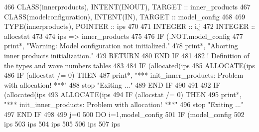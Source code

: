 \begin{DoxyCode}
466     \textcolor{keywordtype}{CLASS}(innerproducts), \textcolor{keywordtype}{INTENT(INOUT)}, \textcolor{keywordtype}{TARGET} :: inner\_products
467     \textcolor{keywordtype}{CLASS}(modelconfiguration), \textcolor{keywordtype}{INTENT(IN)}, \textcolor{keywordtype}{TARGET} :: model\_config
468 
469     \textcolor{keywordtype}{TYPE}(innerproducts), \textcolor{keywordtype}{POINTER} :: ips
470 
471     \textcolor{keywordtype}{INTEGER} :: i,j
472     \textcolor{keywordtype}{INTEGER} :: allocstat
473 
474     ips => inner\_products
475 
476     \textcolor{keywordflow}{IF} (.NOT.model\_config%
477       print*, \textcolor{stringliteral}{"Warning: Model configuration not initialized."}
478       print*, \textcolor{stringliteral}{"Aborting inner products initialization."}
479       \textcolor{keywordflow}{RETURN}
480 \textcolor{keywordflow}{    END IF}
481 
482     \textcolor{comment}{! Definition of the types and wave numbers tables}
483 
484     \textcolor{keywordflow}{IF} (\textcolor{keyword}{allocated}(ips%
485     \textcolor{keyword}{ALLOCATE}(ips%
486     \textcolor{keywordflow}{IF} (allocstat /= 0) \textcolor{keywordflow}{THEN}
487       print*, \textcolor{stringliteral}{"*** init\_inner\_products: Problem with allocation! ***"}
488       stop \textcolor{stringliteral}{"Exiting ..."}
489 \textcolor{keywordflow}{    END IF}
490 
491 
492     \textcolor{keywordflow}{IF} (\textcolor{keyword}{allocated}(ips%
493     \textcolor{keyword}{ALLOCATE}(ips%
494     \textcolor{keywordflow}{IF} (allocstat /= 0) \textcolor{keywordflow}{THEN}
495       print*, \textcolor{stringliteral}{"*** init\_inner\_products: Problem with allocation! ***"}
496       stop \textcolor{stringliteral}{"Exiting ..."}
497 \textcolor{keywordflow}{    END IF}
498 
499     j=0
500     \textcolor{keywordflow}{DO} i=1,model\_config%
501       \textcolor{keywordflow}{IF} (model\_config%
502         ips%
503         ips%
504         ips%
505 
506         ips%
507         ips%

\end{DoxyCode}
